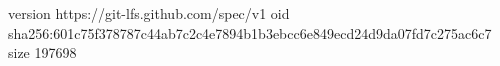 version https://git-lfs.github.com/spec/v1
oid sha256:601c75f378787c44ab7c2c4e7894b1b3ebcc6e849ecd24d9da07fd7c275ac6c7
size 197698
